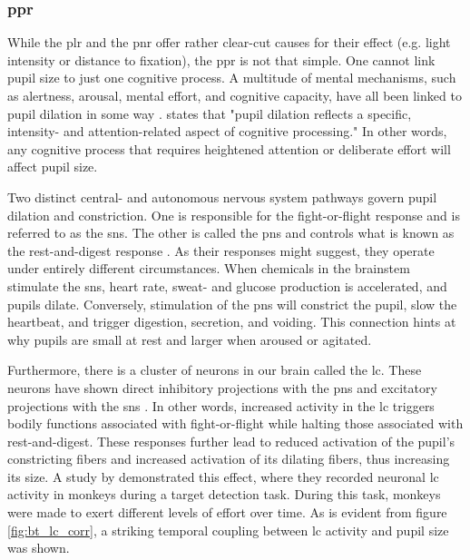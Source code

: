 \subsubsection{\acrfull{ppr}}

While the \acrshort{plr} and the \acrshort{pnr} offer rather clear-cut causes for their effect (e.g. light intensity or distance to fixation), the \acrshort{ppr} is not that simple. One cannot link pupil size to just one cognitive process. A multitude of mental mechanisms, such as alertness, arousal, mental effort, and cognitive capacity, have all been linked to pupil dilation in some way \cite{beatty1982, just2003, andreassi2000}. \textcite{eckstein2017} states that "pupil dilation reflects a specific, intensity- and attention-related aspect of cognitive processing."
In other words, any cognitive process that requires heightened attention or deliberate effort will affect pupil size.

Two distinct central- and autonomous nervous system pathways govern pupil dilation and constriction. One is responsible for the fight-or-flight response and is referred to as the \acrfull{sns}. The other is called the \acrfull{pns} and controls what is known as the rest-and-digest response \cite{blessing2008}. As their responses might suggest, they operate under entirely different circumstances. When chemicals in the brainstem stimulate the \acrshort{sns}, heart rate, sweat- and glucose production is accelerated, and pupils dilate. Conversely, stimulation of the \acrshort{pns} will constrict the pupil, slow the heartbeat, and trigger digestion, secretion, and voiding. This connection hints at why pupils are small at rest and larger when aroused or agitated.

Furthermore, there is a cluster of neurons in our brain called the \acrfull{lc}. These neurons have shown direct inhibitory projections with the \acrshort{pns} and excitatory projections with the \acrshort{sns} \cite{eckstein2017}. In other words, increased activity in the \acrshort{lc} triggers bodily functions associated with fight-or-flight while halting those associated with rest-and-digest. These responses further lead to reduced activation of the pupil's constricting fibers and increased activation of its dilating fibers, thus increasing its size. A study by \textcite{rajkowski1993} demonstrated this effect, where they recorded neuronal \acrshort{lc} activity in monkeys during a target detection task. During this task, monkeys were made to exert different levels of effort over time. As is evident from figure \ref{fig:bt_lc_corr}, a striking temporal coupling between \acrshort{lc} activity and pupil size was shown. 

